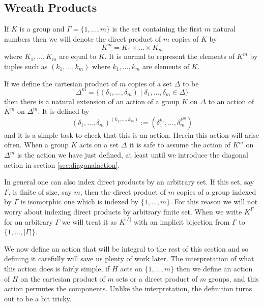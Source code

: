 \documentclass[]{article}
\theoremstyle{definition}
\begin{document}
\subsection{Wreath Products} \label{sec:wreathproducts}
If $K$ is a group and $\Gamma = \{1, \dots, m \}$ is the set containing the first $m$ natural numbers then we will denote the direct product of $m$ copies of $K$ by
$$K^m = K_1 \times \dots \times K_m$$
where $K_1,\dots,K_m$ are equal to $K$. It is normal to represent the elements of $K^m$ by tuples such as $(k_1,\dots,k_m)$ where $k_1,\dots,k_m$ are elements of $K$. 

If we define the cartesian product of $m$ copies of a set $\Delta$ to be
$$\Delta^m = \{(\delta_1,\dots,\delta_m) \; | \; \delta_1,\dots,\delta_m \in \Delta \}$$
then there is a natural extension of an action of a group $K$ on $\Delta$ to an action of $K^m$ on $\Delta^m$. It is defined by $$(\delta_1,\dots,\delta_m)^{(k_1,\dots,k_m)}:=(\delta^{k_1}_1,\dots,\delta^{k^m}_m)$$
and it is a simple task to check that this is an action. Herein this action will arise often. When a group $K$ acts on a set $\Delta$ it is safe to assume the action of $K^m$ on $\Delta^m$ is the action we have just defined, at least until we introduce the diagonal action in section \ref{sec:diagonalaction}.

In general one can also index direct products by an arbitrary set. If this set, say $\Gamma$, is finite of size, say $m$, then the direct product of $m$ copies of a group indexed by $\Gamma$ is isomorphic one which is indexed by $\{1,\dots, m\}$. For this reason we will not worry about indexing direct products by arbitrary finite set. When we write $K^\Gamma$ for an arbitrary $\Gamma$ we will treat it as $K^{|\Gamma|}$ with an implicit bijection from $\Gamma$ to $\{1, \dots, |\Gamma| \}$.

We now define an action that will be integral to the rest of this section and so defining it carefully will save us plenty of work later. The interpretation of what this action does is fairly simple, if $H$ acts on $\{1,\dots,m \}$ then we define an action of $H$ on the cartesian product of $m$ sets or a direct product of $m$ groups, and this action permutes the components. Unlike the interpretation, the definition turns out to be a bit tricky.
\end{document}
